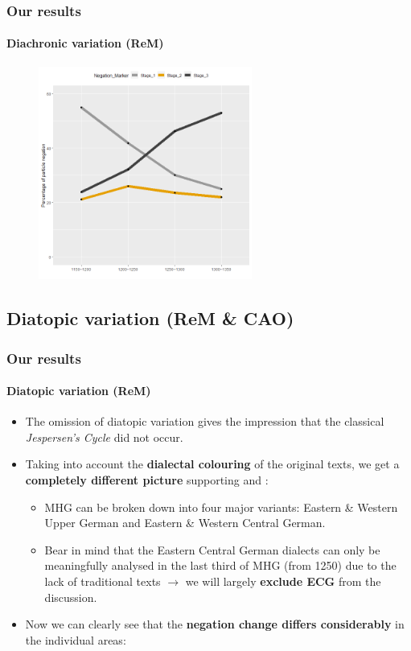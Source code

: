 \documentclass[xcolor=table, compress, %
handout
]{beamer}
\begin{document}
\begin{frame}
\frametitle{Our results}
\framesubtitle{Diachronic variation (ReM)}
    
    \begin{figure}[h]
\centering
\includegraphics[width=7cm]{Diachron.png}
\end{figure}
    
\end{frame}

\subsection{Diatopic variation (ReM \& CAO)}
\begin{frame}
\frametitle{Our results}
\framesubtitle{Diatopic variation (ReM)}
    \begin{itemize}
        \item The omission of diatopic variation gives the impression that the classical \textit{Jespersen's Cycle} did not occur.
        \item Taking into account the \textbf{dialectal colouring} of the original texts, we get a \textbf{completely different picture} supporting \citet{schueler16,schueler17} and \citet{HertelimErscheinen}:
        \begin{itemize}
            \item MHG can be broken down into four major variants: Eastern \& Western Upper German and Eastern \& Western Central German.
            \item Bear in mind that the Eastern Central German dialects can only be meaningfully analysed in the last third of MHG (from 1250) due to the lack of traditional texts $\rightarrow$ we will largely \textbf{exclude ECG} from the discussion.
        \end{itemize}
        \item Now we can clearly see that the \textbf{negation change differs considerably} in the individual areas:
    \end{itemize}
\end{frame}
\end{document}
